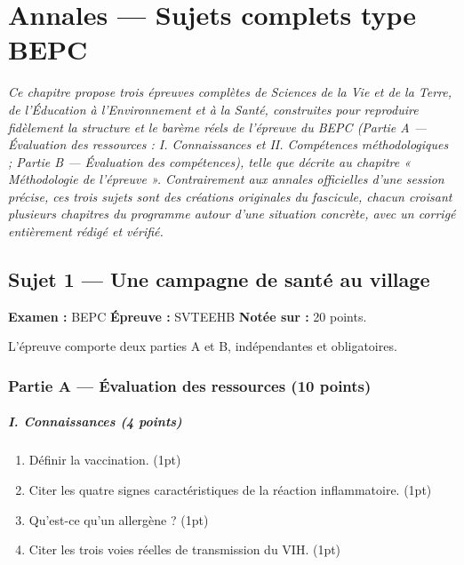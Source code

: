 \chapter{Annales — Sujets complets type BEPC}

\noindent\textit{Ce chapitre propose trois épreuves complètes de Sciences de la Vie et
de la Terre, de l'Éducation à l'Environnement et à la Santé, construites pour
reproduire fidèlement la structure et le barème réels de l'épreuve du BEPC (Partie A —
Évaluation des ressources : I. Connaissances et II. Compétences méthodologiques ;
Partie B — Évaluation des compétences), telle que décrite au chapitre « Méthodologie
de l'épreuve ». Contrairement aux annales officielles d'une session précise, ces trois
sujets sont des créations originales du fascicule, chacun croisant plusieurs chapitres
du programme autour d'une situation concrète, avec un corrigé entièrement rédigé et
vérifié.}
\vspace{8pt}

\connecteBanner

\section{Sujet 1 — Une campagne de santé au village}

\noindent\textbf{Examen :} BEPC \quad\textbf{Épreuve :} SVTEEHB \quad\textbf{Notée
sur :} 20 points.
\par\smallskip\noindent
L'épreuve comporte deux parties A et B, indépendantes et obligatoires.

\subsection*{Partie A — Évaluation des ressources (10 points)}

\paragraph{I. Connaissances (4 points)}
\begin{enumerate}[label=\arabic*)]
\item Définir la vaccination. \hfill (1pt)
\item Citer les quatre signes caractéristiques de la réaction inflammatoire. \hfill
(1pt)
\item Qu'est-ce qu'un allergène ? \hfill (1pt)
\item Citer les trois voies réelles de transmission du VIH. \hfill (1pt)
\end{enumerate}

